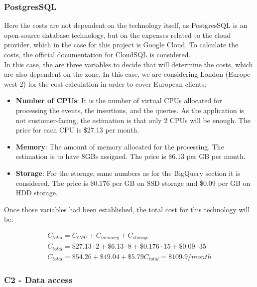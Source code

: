 \documentclass[english, 12pt, a4paper, sci, utf8, a-1b, online]{aaltothesis}
\begin{document}
\subsubsection*{PostgresSQL}

Here the costs are not dependent on the technology itself, as PostgresSQL is an open-source database technology, but on the expenses related to the cloud provider, which in the case for this project is Google Cloud. To calculate the costs, the official documentation for CloudSQL \cite{PostgreSQLonGCP} is considered.\\

In this case, the are three variables to decide that will determine the costs, which are also dependent on the zone. In this case, we are considering London (Europe west-2) for the cost calculation in order to cover European clients:

\begin{itemize}
    \item \textbf{Number of CPUs}: It is the number of virtual CPUs allocated for processing the events, the insertions, and the queries. As the application is not customer-facing, the estimation is that only 2 CPUs will be enough. The price for each CPU is \$27.13 per month.
    \item \textbf{Memory}: The amount of memory allocated for the processing. The estimation is to have 8GBs assigned. The price is \$6.13 per GB per month.
    \item \textbf{Storage}: For the storage, same numbers as for the BigQuery section it is considered. The price is \$0.176 per GB on SSD storage and \$0.09 per GB on HDD storage.
\end{itemize}

Once those variables had been established, the total cost for this technology will be:

\begin{equation}
\begin{split}
    C_{total} = C_{CPU} + C_{memory} + C_{storage}\\
    C_{total} = \$27.13 \cdot 2 + \$6.13 \cdot 8 + \$0.176 \cdot 15 + \$0.09 \cdot 35\\
    C_{total} = \$54.26 + \$49.04 + \$5.79
    C_{total} = \$109.9 / month
\end{split}
\end{equation}

\subsubsection*{C2 - Data access}
\end{document}
